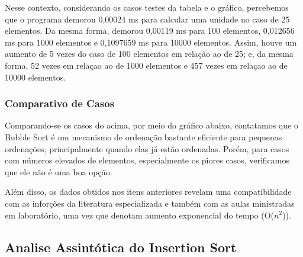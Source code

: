 \documentclass[a4paper, 12pt]{article}
\begin{document}
Nesse contexto, considerando os casos testes da tabela e o gráfico, percebemos que o programa demorou 0,00024 ms para calcular uma unidade no caso de 25 elementos. Da mesma forma, demorou 0,00119 ms para 100 elementos, 0,012656 ms para 1000 elementos e 0,1097659 ms para 10000 elementos. Assim, houve um aumento de 5 vezes do caso de 100 elementos em relação ao de 25; e, da mesma forma, 52 vezes em relaçao ao de 1000 elementos e 457 vezes em relaçao ao de 10000 elementos.


\subsubsection{Comparativo de Casos}

Comparando-se os casos do acima, por meio do gráfico abaixo, contatamos que o Bubble Sort é um mecanismo de ordenação bastante eficiente para pequenas ordenações, principalmente quando elas já estão ordenadas. Porém, para casos com números elevados de elementos, especialmente os piores casos, verificamos que ele não é uma boa opção.

\begin{center}
\end{center}

Além disso, os dados obtidos nos itens anteriores revelam uma compatibilidade com as inforções da literatura especializada e também com as aulas ministradas em laboratório, uma vez que denotam aumento exponencial do tempo (O($n^2$)).

\vspace{0.8cm}
\subsection{Analise Assintótica do Insertion Sort}
\end{document}
